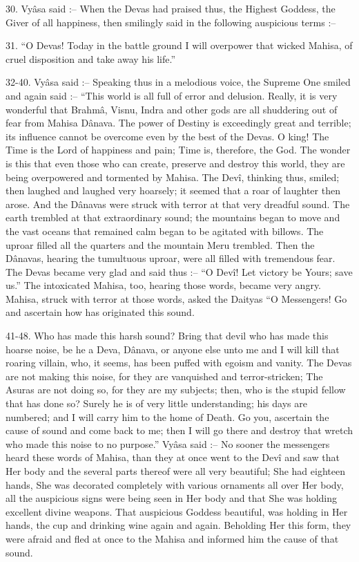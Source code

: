 30. Vy\^asa said :-- When the Devas had praised thus, the Highest Goddess, the Giver of all happiness, then smilingly said in the following auspicious terms :--

31. ``O Devas! Today in the battle ground I will overpower that wicked Mahisa, of cruel disposition and take away his life.''

32-40. Vy\^asa said :-- Speaking thus in a melodious voice, the Supreme One smiled and again said :-- ``This world is all full of error and delusion. Really, it is very wonderful that Brahm\^a, Visnu, Indra and other gods are all shuddering out of fear from Mahisa D\^anava. The power of Destiny is exceedingly great and terrible; its influence cannot be overcome even by the best of the Devas. O king! The Time is the Lord of happiness and pain; Time is, therefore, the God. The wonder is this that even those who can create, preserve and destroy this world, they are being overpowered and tormented by Mahisa. The Dev\^i, thinking thus, smiled; then laughed and laughed very hoarsely; it seemed that a roar of laughter then arose. And the D\^anavas were struck with terror at that very dreadful sound. The earth trembled at that extraordinary sound; the mountains began to move and the vast oceans that remained calm began to be agitated with billows. The uproar filled all the quarters and the mountain Meru trembled. Then the D\^anavas, hearing the tumultuous uproar, were all filled with tremendous fear. The Devas became very glad and said thus :-- ``O Dev\^i! Let victory be Yours; save us.'' The intoxicated Mahisa, too, hearing those words, became very angry. Mahisa, struck with terror at those words, asked the Daityas ``O Messengers! Go and ascertain how has originated this sound.

41-48. Who has made this harsh sound? Bring that devil who has made this hoarse noise, be he a Deva, D\^anava, or anyone else unto me and I will kill that roaring villain, who, it seems, has been puffed with egoism and vanity. The Devas are not making this noise, for they are vanquished and terror-stricken; The Asuras are not doing so, for they are my subjects; then, who is the stupid fellow that has done so? Surely he is of very little understanding; his days are numbered; and I will carry him to the home of Death. Go you, ascertain the cause of sound and come back to me; then I will go there and destroy that wretch who made this noise to no purpose.'' Vy\^asa said :-- No sooner the messengers heard these words of Mahisa, than they at once went to the Dev\^i and saw that Her body and the several parts thereof were all very beautiful; She had eighteen hands, She was decorated completely with various ornaments all over Her body, all the auspicious signs were being seen in Her body and that She was holding excellent divine weapons. That auspicious Goddess beautiful, was holding in Her hands, the cup and drinking wine again and again. Beholding Her this form, they were afraid and fled at once to the Mahisa and informed him the cause of that sound.

